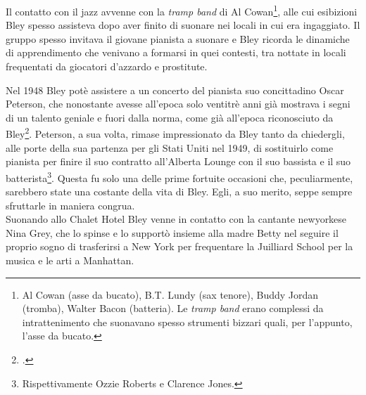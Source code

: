 Il contatto con il jazz avvenne con la \textit{tramp band} di Al Cowan\footnote{Al Cowan (asse da bucato), B.T. Lundy (sax tenore), Buddy Jordan (tromba), Walter Bacon (batteria). Le \textit{tramp band} erano complessi da intrattenimento che suonavano spesso strumenti bizzari quali, per l'appunto, l'asse da bucato.}, alle cui esibizioni Bley spesso assisteva dopo aver finito di suonare nei locali in cui era ingaggiato. Il gruppo spesso invitava il giovane pianista a suonare e Bley ricorda le dinamiche di apprendimento che venivano a formarsi in quei contesti, tra nottate in locali frequentati da giocatori d'azzardo e prostitute.\par
Nel 1948 Bley potè assistere a un concerto del pianista suo concittadino Oscar Peterson, che nonostante avesse all'epoca solo ventitrè anni già mostrava i segni di un talento geniale e fuori dalla norma, come già all'epoca riconosciuto da Bley\footcite[20]{stopping}. Peterson, a sua volta, rimase impressionato da Bley tanto da chiedergli, alle porte della sua partenza per gli Stati Uniti nel 1949, di sostituirlo come pianista per finire il suo contratto all'Alberta Lounge con il suo bassista e il suo batterista\footnote{Rispettivamente Ozzie Roberts e Clarence Jones.}. Questa fu solo una delle prime fortuite occasioni che, peculiarmente, sarebbero state una costante della vita di Bley. Egli, a suo merito, seppe sempre sfruttarle in maniera congrua.\\
Suonando allo Chalet Hotel Bley venne in contatto con la cantante newyorkese Nina Grey, che lo spinse e lo supportò insieme alla madre Betty nel seguire il proprio sogno di trasferirsi a New York per frequentare la Juilliard School per la musica e le arti a Manhattan. \par
